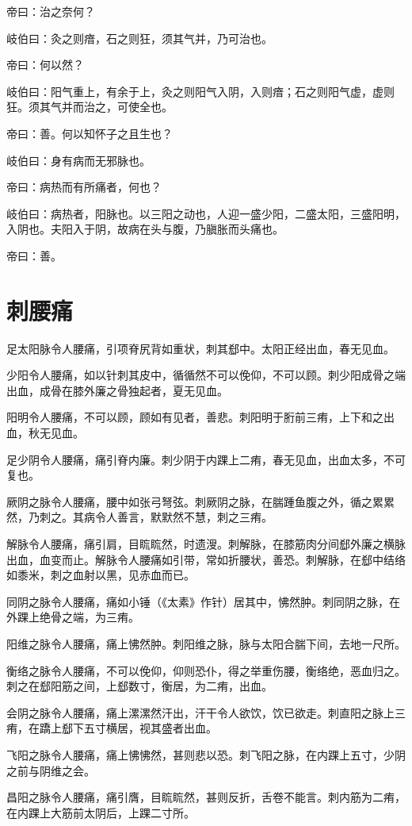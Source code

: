 \documentclass{article}%
\begin{document}
帝曰：治之奈何？

岐伯曰：灸之则瘖，石之则狂，须其气并，乃可治也。

帝曰：何以然？

岐伯曰：阳气重上，有余于上，灸之则阳气入阴，入则瘖；石之则阳气虚，虚则狂。须其气并而治之，可使全也。

帝曰：善。何以知怀子之且生也？

岐伯曰：身有病而无邪脉也。

帝曰：病热而有所痛者，何也？

岐伯曰：病热者，阳脉也。以三阳之动也，人迎一盛少阳，二盛太阳，三盛阳明，入阴也。夫阳入于阴，故病在头与腹，乃䐜胀而头痛也。

帝曰：善。
\section{刺腰痛}
足太阳脉令人腰痛，引项脊尻背如重状，刺其郄中。太阳正经出血，春无见血。

少阳令人腰痛，如以针刺其皮中，循循然不可以俛仰，不可以顾。刺少阳成骨之端出血，成骨在膝外廉之骨独起者，夏无见血。

阳明令人腰痛，不可以顾，顾如有见者，善悲。刺阳明于胻前三痏，上下和之出血，秋无见血。

足少阴令人腰痛，痛引脊内廉。刺少阴于内踝上二痏，春无见血，出血太多，不可复也。

厥阴之脉令人腰痛，腰中如张弓弩弦。刺厥阴之脉，在腨踵鱼腹之外，循之累累然，乃刺之。其病令人善言，默默然不慧，刺之三痏。

解脉令人腰痛，痛引肩，目䀮䀮然，时遗溲。刺解脉，在膝筋肉分间郄外廉之横脉出血，血变而止。解脉令人腰痛如引带，常如折腰状，善恐。刺解脉，在郄中结络如黍米，刺之血射以黑，见赤血而已。

同阴之脉令人腰痛，痛如小锤（《太素》作针）居其中，怫然肿。刺同阴之脉，在外踝上绝骨之端，为三痏。

阳维之脉令人腰痛，痛上怫然肿。刺阳维之脉，脉与太阳合腨下间，去地一尺所。

衡络之脉令人腰痛，不可以俛仰，仰则恐仆，得之举重伤腰，衡络绝，恶血归之。刺之在郄阳筋之间，上郄数寸，衡居，为二痏，出血。

会阴之脉令人腰痛，痛上漯漯然汗出，汗干令人欲饮，饮已欲走。刺直阳之脉上三痏，在蹻上郄下五寸横居，视其盛者出血。

飞阳之脉令人腰痛，痛上怫怫然，甚则悲以恐。刺飞阳之脉，在内踝上五寸，少阴之前与阴维之会。

昌阳之脉令人腰痛，痛引膺，目䀮䀮然，甚则反折，舌卷不能言。刺内筋为二痏，在内踝上大筋前太阴后，上踝二寸所。
\end{document}
